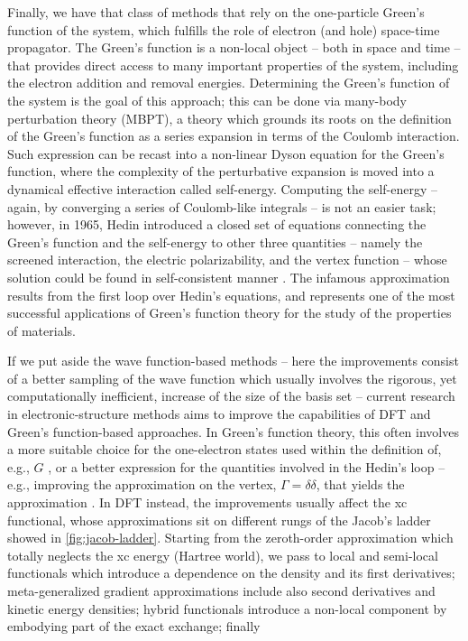 Finally, we have that class of methods that rely on the one-particle Green's function of the system, which fulfills the role of electron (and hole) space-time propagator. The Green's function is a non-local object -- both in space and time -- that provides direct access to many important properties of the system, including the electron addition and removal energies. Determining the Green's function of the system is the goal of this approach; this can be done via many-body perturbation theory (MBPT), a theory which grounds its roots on the definition of the Green's function as a series expansion in terms of the Coulomb interaction. Such expression can be recast into a non-linear Dyson equation for the Green's function, where the complexity of the perturbative expansion is moved into a dynamical effective interaction called self-energy. Computing the self-energy -- again, by converging a series of Coulomb-like integrals -- is not an easier task; however, in 1965, Hedin introduced a closed set of equations connecting the Green's function and the self-energy to other three quantities -- namely the screened interaction, the electric polarizability, and the vertex function -- whose solution could be found in self-consistent manner \cite{hedin_new_1965}. The infamous \gw approximation results from the first loop over Hedin's equations, and represents one of the most successful applications of Green's function theory for the study of the properties of materials.

If we put aside the wave function-based methods -- here the improvements consist of a better sampling of the wave function which usually involves the rigorous, yet computationally inefficient, increase of the size of the basis set -- current research in electronic-structure methods aims to improve the capabilities of DFT and Green's function-based approaches. In Green's function theory, this often involves a more suitable choice for the one-electron states used within the definition of, e.g., $G$ \cite{bruneval_benchmarking_2013}, or a better expression for the quantities involved in the Hedin's loop -- e.g., improving the approximation on the vertex, $\Gamma=\delta \delta$, that yields the \gw approximation \cite{chen_accurate_2015}. In DFT instead, the improvements usually affect the xc functional, whose approximations sit on different rungs of the Jacob's ladder showed in \cref{fig:jacob-ladder}. Starting from the zeroth-order approximation which totally neglects the xc energy (Hartree world), we pass to local and semi-local functionals which introduce a dependence on the density and its first derivatives; meta-generalized gradient approximations include also second derivatives and kinetic energy densities; hybrid functionals introduce a non-local component by embodying part of the exact exchange; finally 

